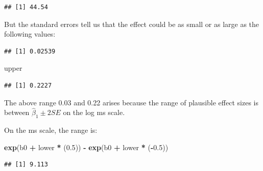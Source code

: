 \documentclass[12pt,]{krantz}
\newenvironment{Shaded}{\begin{snugshade}}{\end{snugshade}}
\newcommand{\DecValTok}[1]{\textcolor[rgb]{0.00,0.00,0.81}{#1}}
\newcommand{\FloatTok}[1]{\textcolor[rgb]{0.00,0.00,0.81}{#1}}
\newcommand{\KeywordTok}[1]{\textcolor[rgb]{0.13,0.29,0.53}{\textbf{#1}}}
\newcommand{\NormalTok}[1]{#1}
\newcommand{\OperatorTok}[1]{\textcolor[rgb]{0.81,0.36,0.00}{\textbf{#1}}}
\newcommand{\StringTok}[1]{\textcolor[rgb]{0.31,0.60,0.02}{#1}}
\begin{document}
\begin{verbatim}
## [1] 44.54
\end{verbatim}

But the standard errors tell us that the effect could be as small or as large as the following values:

\begin{Shaded}
\end{Shaded}

\begin{verbatim}
## [1] 0.02539
\end{verbatim}

\begin{Shaded}
\begin{Highlighting}[]
\NormalTok{upper}
\end{Highlighting}
\end{Shaded}

\begin{verbatim}
## [1] 0.2227
\end{verbatim}

The above range 0.03 and 0.22 arises because the range of plausible effect sizes is between \(\hat\beta_1 \pm 2SE\) on the log ms scale.

On the ms scale, the range is:

\begin{Shaded}
\begin{Highlighting}[]
\KeywordTok{exp}\NormalTok{(b0 }\OperatorTok{+}\StringTok{ }\NormalTok{lower }\OperatorTok{*}\StringTok{ }\NormalTok{(}\FloatTok{0.5}\NormalTok{)) }\OperatorTok{-}\StringTok{ }\KeywordTok{exp}\NormalTok{(b0 }\OperatorTok{+}\StringTok{ }\NormalTok{lower }\OperatorTok{*}\StringTok{ }
\StringTok{  }\NormalTok{(}\OperatorTok{-}\FloatTok{0.5}\NormalTok{))}
\end{Highlighting}
\end{Shaded}

\begin{verbatim}
## [1] 9.113
\end{verbatim}
\end{document}
